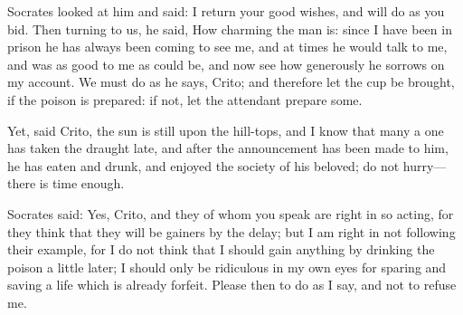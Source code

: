 Socrates looked at him and said: I return your good wishes, and will do as
you bid. Then turning to us, he said, How charming the man is: since I
have been in prison he has always been coming to see me, and at times he
would talk to me, and was as good to me as could be, and now see how
generously he sorrows on my account. We must do as he says, Crito; and
therefore let the cup be brought, if the poison is prepared: if not, let
the attendant prepare some.

Yet, said Crito, the sun is still upon the hill-tops, and I know that many
a one has taken the draught late, and after the announcement has been made
to him, he has eaten and drunk, and enjoyed the society of his beloved; do
not hurry—there is time enough.

Socrates said: Yes, Crito, and they of whom you speak are right in so
acting, for they think that they will be gainers by the delay; but I am
right in not following their example, for I do not think that I should
gain anything by drinking the poison a little later; I should only be
ridiculous in my own eyes for sparing and saving a life which is already
forfeit. Please then to do as I say, and not to refuse me.

